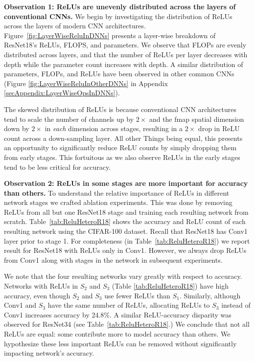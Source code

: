 

\textbf{Observation 1: ReLUs are unevenly distributed across
the layers of conventional CNNs.} 
We begin by investigating the distribution of ReLUs across the layers of modern CNN architectures. 
Figure~\ref{fig:LayerWiseReluInDNNs} presents a layer-wise breakdown
of ResNet18's ReLUs, FLOPS, and parameters.
We observe that FLOPs are evenly distributed across layers,
and that the number of ReLUs per layer decreases with depth while 
the parameter count increases with depth.
A similar distribution of parameters, FLOPs, and ReLUs have
been observed in other common CNNs
(Figure \ref{fig:LayerWiseReluInOtherDNNs} in  Appendix \ref{secAppendix:LayerWiseOpsInDNNs}).

The skewed distribution of ReLUs is because
conventional CNN architectures
tend to scale the number of channels up by $2\times$ and the fmap spatial dimension down by $2\times$ in \emph{each} dimension across stages, 
resulting in a $2\times$ drop in ReLU count across a down-sampling layer.
All other Things being equal, this presents an opportunity to significantly reduce
ReLU counts by simply dropping them from early stages.
This fortuitous as we also observe
ReLUs in the early stages tend to be less critical for accuracy.


\textbf{Observation 2: ReLUs in some stages are more 
important for accuracy than others.}
To understand the relative importance of ReLUs in different network stages
we crafted ablation experiments.
This was done by removing ReLUs from all but one ResNet18 stage
and training each resulting network from scratch.
Table~\ref{tab:ReluHeteroR18} shows the accuracy and ReLU count of each resulting network
using the CIFAR-100 dataset. 
Recall that ResNet18 has Conv1 layer prior to stage 1.
For completeness (in Table~\ref{tab:ReluHeteroR18}) we report result for ResNet18 with ReLUs only in Conv1.  However, we always drop ReLUs from Conv1 along with stages in the network in subsequent experiments.

We note that the four resulting networks vary greatly with respect to accuracy. 
Networks with ReLUs in $S_2$ and $S_3$ (Table \ref{tab:ReluHeteroR18}) have high accuracy, 
even though $S_2$ and $S_3$ use fewer ReLUs than $S_1$. 
Similarly, although Conv1 and $S_3$ have the same number of ReLUs, 
allocating ReLUs to $S_3$ instead of Conv1 increases accuracy by 24.8\%. 
A similar ReLU-accuracy disparity was observed for ResNet34 (see Table~\ref{tab:ReluHeteroR18}.) 
We conclude that not all ReLUs are equal:
some contribute more to model accuracy than others.
We hypothesize these less important ReLUs can be removed without significantly impacting network's accuracy.



